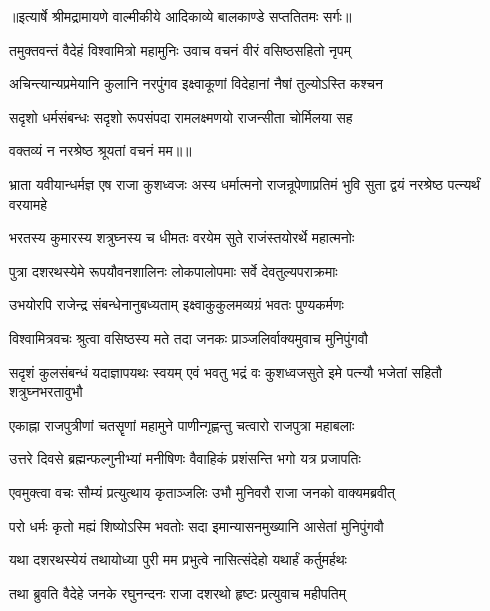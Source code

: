 {॥इत्यार्षे श्रीमद्रामायणे वाल्मीकीये आदिकाव्ये बालकाण्डे सप्ततितमः सर्गः॥}


\twolineshloka
{तमुक्तवन्तं वैदेहं विश्वामित्रो महामुनिः}
{उवाच वचनं वीरं वसिष्ठसहितो नृपम्} %

\twolineshloka
{अचिन्त्यान्यप्रमेयानि कुलानि नरपुंगव}
{इक्ष्वाकूणां विदेहानां नैषां तुल्योऽस्ति कश्चन} %

\twolineshloka
{सदृशो धर्मसंबन्धः सदृशो रूपसंपदा}
{रामलक्ष्मणयो राजन्सीता चोर्मिलया सह} %

{वक्तव्यं न नरश्रेष्ठ श्रूयतां वचनं मम॥॥} %

\addtocounter{shlokacount}{1}

\threelineshloka
{भ्राता यवीयान्धर्मज्ञ एष राजा कुशध्वजः}
{अस्य धर्मात्मनो राजन्रूपेणाप्रतिमं भुवि}
{सुता द्वयं नरश्रेष्ठ पत्न्यर्थं वरयामहे} %

\twolineshloka
{भरतस्य कुमारस्य शत्रुघ्नस्य च धीमतः}
{वरयेम सुते राजंस्तयोरर्थे महात्मनोः} %

\twolineshloka
{पुत्रा दशरथस्येमे रूपयौवनशालिनः}
{लोकपालोपमाः सर्वे देवतुल्यपराक्रमाः} %

\twolineshloka
{उभयोरपि राजेन्द्र संबन्धेनानुबध्यताम्}
{इक्ष्वाकुकुलमव्यग्रं भवतः पुण्यकर्मणः} %

\twolineshloka
{विश्वामित्रवचः श्रुत्वा वसिष्ठस्य मते तदा}
{जनकः प्राञ्जलिर्वाक्यमुवाच मुनिपुंगवौ} %

\threelineshloka
{सदृशं कुलसंबन्धं यदाज्ञापयथः स्वयम्}
{एवं भवतु भद्रं वः कुशध्वजसुते इमे}
{पत्न्यौ भजेतां सहितौ शत्रुघ्नभरतावुभौ} %

\twolineshloka
{एकाह्ना राजपुत्रीणां चतसॄणां महामुने}
{पाणीन्गृह्णन्तु चत्वारो राजपुत्रा महाबलाः} %

\twolineshloka
{उत्तरे दिवसे ब्रह्मन्फल्गुनीभ्यां मनीषिणः}
{वैवाहिकं प्रशंसन्ति भगो यत्र प्रजापतिः} %

\twolineshloka
{एवमुक्त्वा वचः सौम्यं प्रत्युत्थाय कृताञ्जलिः}
{उभौ मुनिवरौ राजा जनको वाक्यमब्रवीत्} %

\twolineshloka
{परो धर्मः कृतो मह्यं शिष्योऽस्मि भवतोः सदा}
{इमान्यासनमुख्यानि आसेतां मुनिपुंगवौ} %

\twolineshloka
{यथा दशरथस्येयं तथायोध्या पुरी मम}
{प्रभुत्वे नासित्संदेहो यथार्हं कर्तुमर्हथः} %

\twolineshloka
{तथा ब्रुवति वैदेहे जनके रघुनन्दनः}
{राजा दशरथो हृष्टः प्रत्युवाच महीपतिम्} %

